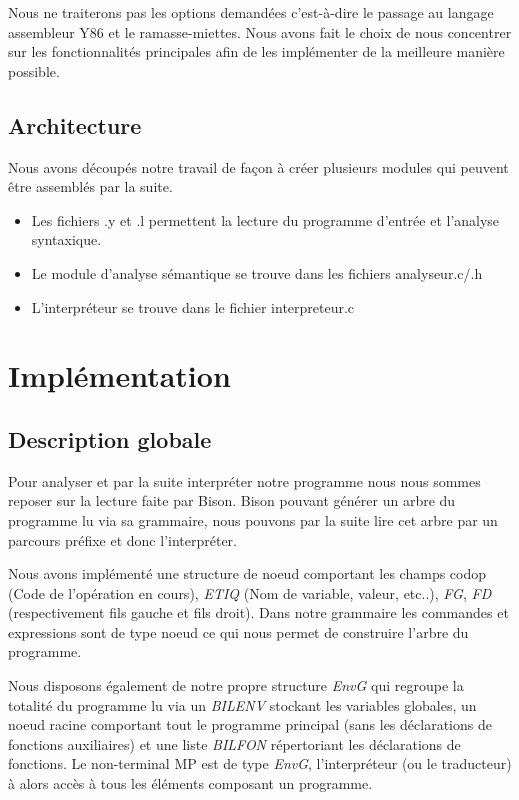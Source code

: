 \documentclass[10pt,a4paper]{article}
\begin{document}
Nous ne traiterons pas les options demandées c'est-à-dire le passage au langage assembleur Y86 et le ramasse-miettes.
Nous avons fait le choix de nous concentrer sur les fonctionnalités principales afin de les implémenter de la meilleure manière possible.

\subsection{Architecture}
Nous avons découpés notre travail de façon à créer plusieurs modules qui peuvent être assemblés par la suite.\\

\begin{itemize}
    \item Les fichiers .y et .l permettent la lecture du programme d'entrée et l'analyse syntaxique.
    \item Le module d'analyse sémantique se trouve dans les fichiers analyseur.c/.h
    \item L'interpréteur se trouve dans le fichier interpreteur.c
\end{itemize}



\section{Implémentation}
\subsection{Description globale}
Pour analyser et par la suite interpréter notre programme nous nous sommes reposer sur la lecture faite par Bison.
Bison pouvant générer un arbre du programme lu via sa grammaire, nous pouvons par la suite lire cet arbre par un parcours préfixe et donc l'interpréter.

Nous avons implémenté une structure de noeud comportant les champs codop (Code de l'opération en cours), \textit{ETIQ} (Nom de variable, valeur, etc..), \textit{FG}, \textit{FD} 
(respectivement fils gauche et fils droit). Dans notre grammaire les commandes et expressions sont de type noeud ce qui nous permet de construire l'arbre du programme.

Nous disposons également de notre propre structure \textit{EnvG} qui regroupe la totalité du programme lu via un \textit{BILENV} stockant les variables globales, un noeud 
racine comportant tout le programme principal (sans les déclarations de fonctions auxiliaires) et une liste \textit{BILFON} répertoriant les déclarations de fonctions. 
Le non-terminal MP est de type \textit{EnvG}, l'interpréteur (ou le traducteur) à alors accès à tous les éléments composant un programme.
\end{document}
